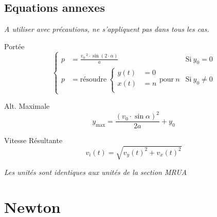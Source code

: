 \documentclass[12pt,a4paper]{article} %
\begin{document}
\subsection*{Equations annexes}
\emph{A utiliser avec précautions, ne s'appliquent pas dans tous les cas.}
\par\vspace{1em}
\begin{twocols}[0.5][0.4][t]
	Port\'ee
	\begin{equation*}
		\left\{
		\begin{array}{rll}
			p &= {\displaystyle \frac{v_0\,^2 \cdot \sin (2 \cdot \alpha)}{a}} & \text{Si}\:y_0 = 0 \\[1em]
			p &= \text{résoudre}\:\left\{
					\begin{aligned}
						y(t) &= 0 \\
						x(t) &= n \\
					\end{aligned}
			\right.
				\text{pour} \: n
			 & \text{Si}\:y_0 \neq 0
		\end{array}
		\right.
	\end{equation*}

\nextcol

	Alt. Maximale
	\begin{equation*}
		y_\text{max} = \frac{(v_0\cdot\sin{\alpha})^2}{2a} + y_0
	\end{equation*}

	Vitesse Résultante
	\begin{equation*}
		v_i(t) = \sqrt{v_y(t)^2 + v_x(t)^2}
	\end{equation*}

\end{twocols}

\vspace{1em}
\emph{Les unités sont identiques aux unités de la section MRUA}

\newpage

\section{Newton}
\end{document}
